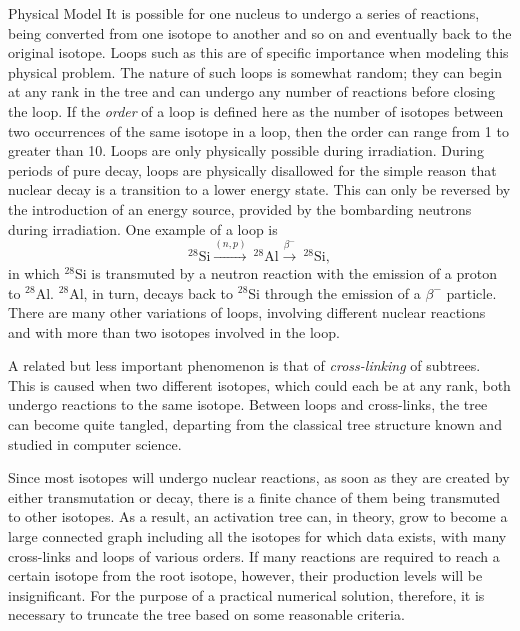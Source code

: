 \begin{chapter}{Physical Model\label{chap:physical}}
It is possible for one nucleus to undergo a series of reactions, being
converted from one isotope to another and so on and eventually back to
the original isotope.  Loops such as this are of specific importance
when modeling this physical problem.  The nature of such loops is
somewhat random; they can begin at any rank in the tree and can
undergo any number of reactions before closing the loop.  If the
\textsl{order} of a loop is defined here as the number of isotopes
between two occurrences of the same isotope in a loop, then the order
can range from 1 to greater than 10.  Loops are only physically
possible during irradiation.  During periods of pure decay, loops are
physically disallowed for the simple reason that nuclear decay is a
transition to a lower energy state.  This can only be reversed by the
introduction of an energy source, provided by the bombarding neutrons
during irradiation.  One example of a loop is
\begin{equation*}
  ^{28}\mathrm{Si} \stackrel{(n,p)}{\longrightarrow} \ ^{28}\mathrm{Al}
  \stackrel{\beta^-}{\longrightarrow} \ ^{28}\mathrm{Si},
\end{equation*}
in which $^{28}$Si is transmuted by a neutron reaction with the
emission of a proton to $^{28}$Al.  $^{28}$Al, in turn, decays back to
$^{28}$Si through the emission of a $\beta^-$ particle.  There are
many other variations of loops, involving different nuclear reactions
and with more than two isotopes involved in the loop.
    
A related but less important phenomenon is that of
\textsl{cross-linking} of subtrees.  This is caused when two different
isotopes, which could each be at any rank, both undergo reactions to
the same isotope.  Between loops and cross-links, the tree can become
quite tangled, departing from the classical tree structure known and
studied in computer science.

Since most isotopes will undergo nuclear reactions, as soon as they
are created by either transmutation or decay, there is a finite chance
of them being transmuted to other isotopes.  As a result, an
activation tree can, in theory, grow to become a large connected graph
including all the isotopes for which data exists, with many
cross-links and loops of various orders.  If many reactions are
required to reach a certain isotope from the root isotope, however,
their production levels will be insignificant.  For the purpose of a
practical numerical solution, therefore, it is necessary to truncate
the tree based on some reasonable criteria.


\end{chapter}
